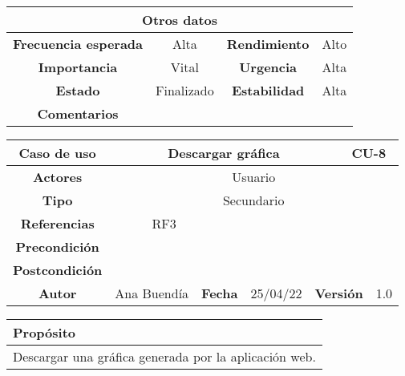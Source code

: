 \begin{table}[!h]
\begin{tabular}{|c|c|c|c|}
\hline
\multicolumn{4}{|c|}{\cellcolor{cyan} \textbf{Otros datos}} \\
\hline
 \cellcolor{cyan} \textbf{Frecuencia esperada}             &      Alta         &    \cellcolor{cyan} \textbf{Rendimiento}          &      Alto        \\
\hline
 \cellcolor{cyan} \textbf{Importancia}             &      Vital         &     \cellcolor{cyan} \textbf{Urgencia}         &      Alta        \\
\hline
 \cellcolor{cyan} \textbf{Estado}             &       Finalizado        &    \cellcolor{cyan} \textbf{Estabilidad}          &     Alta         \\
\hline
\cellcolor{cyan} \textbf{Comentarios}        &  \multicolumn{3}{|c|}{} \\
\hline
\end{tabular}
\end{table}



\clearpage

\begin{table}[!h]
\begin{tabular}{|c|c|c|c|c|c|c|c|}
\hline
\rowcolor{cyan} \textbf{Caso de uso} & \multicolumn{5}{|c|}{Descargar gráfica} & \multicolumn{2}{|c|}{CU-8} \\
\hline
\cellcolor{cyan} \textbf{Actores}              & \multicolumn{7}{|c|}{Usuario}           \\
\hline
\cellcolor{cyan} \textbf{Tipo}                 & \multicolumn{7}{|c|}{Secundario}             \\
\hline
\cellcolor{cyan} \textbf{Referencias}          & \multicolumn{2}{|c|}{RF3}           & \multicolumn{5}{|c|}{}\\
\hline
\cellcolor{cyan} \textbf{Precondición}         & \multicolumn{7}{|c|}{}             \\
\hline
\cellcolor{cyan} \textbf{Postcondición}        & \multicolumn{7}{|c|}{}              \\
\hline
\cellcolor{cyan} \textbf{Autor}                &   Ana Buendía   & \multicolumn{2}{|c|}{\cellcolor{cyan} \textbf{Fecha}} &  25/04/22   & \multicolumn{2}{|c|}{\cellcolor{cyan} \textbf{Versión}} & 1.0  \\
\hline
\end{tabular}
\end{table}

\begin{table}[!h]
\begin{tabularx}{\textwidth}{|Y|}
\hline
{} \textbf{Propósito} \\
\hline
Descargar una gráfica generada por la aplicación web. \\
\hline
\end{tabularx}
\end{table}

